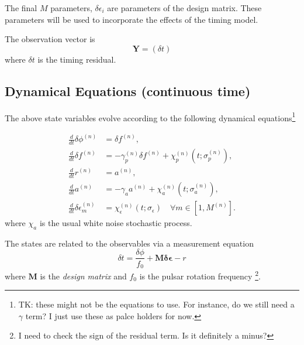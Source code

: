 \documentclass[]{scrartcl}
\begin{document}
\noindent The final $M$ parameters, $\delta \epsilon_i$ are parameters of the design matrix. These parameters will be used to incorporate the effects of the timing model. \newline 



\noindent The observation vector is 
\begin{equation}
	\boldsymbol{Y} = \left(\delta t \right)
\end{equation}
where $\delta t$ is the timing residual.


\subsection{Dynamical Equations (continuous time)}

The above state variables evolve according to the following dynamical equations\footnote{TK: these might not be the equations to use. For instance, do we still need a $\gamma$ term? I just use these as palce holders for now.}


\begin{align}
	\frac{d}{dt} \delta \phi^{(n)} &= \delta f^{(n)}, \\
	\frac{d}{dt} \delta f^{(n)} &= -\gamma_p^{(n)} \delta f^{(n)} + \chi_p^{(n)}(t;\sigma_p^{(n)}), \\
	\frac{d}{dt} r^{(n)} &= a^{(n)}, \\
	\frac{d}{dt} a^{(n)} &= -\gamma_a a^{(n)} + \chi_a^{(n)}(t;\sigma_a^{(n)}), \\
	\frac{d}{dt} \delta \epsilon^{(n)}_{m} &= \chi_\epsilon^{(n)}(t;\sigma_\epsilon) \quad \forall m \in [1, M^{(n)}].
\end{align}
where $\chi_a$ is the usual white noise stochastic process. \newline 



\noindent The states are related to the observables via a measurement equation
\begin{equation}
	\delta t = \frac{\delta \phi}{f_0} + \mathbf{M} \mathbf{\delta \epsilon} - r
\end{equation}
where  $\mathbf{M}$ is the \textit{design matrix} and $f_0$ is the pulsar rotation frequency \footnote{I need to check the sign of the residual term. Is it definitely a minus?}. \newline 
\end{document}
